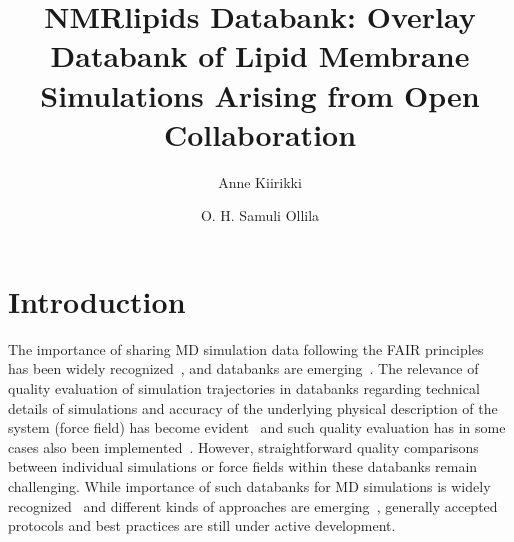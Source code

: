 \documentclass[fleqn,10pt]{wlscirep}
\title{NMRlipids Databank: Overlay Databank of Lipid Membrane Simulations Arising from Open Collaboration}
\author[1,*]{Anne Kiirikki}
\author[1,*]{O. H. Samuli Ollila}
\affil[1]{University of Helsinki, Institute of Biotechonology, Helsinki, Finland}
\affil[*]{samuli.ollila@helsinki.fi}
\begin{document}
\flushbottom
\maketitle
%
%
\thispagestyle{empty}


\section{Introduction}



The importance of sharing MD simulation data following the FAIR principles~\cite{wilkinson16} has been widely recognized~\cite{feig99,tai04,silva06,abraham19,hildebrand19,hospital20,abriata20,espigares20}, and databanks are emerging~\cite{meyer10,kamp10,hospital16,mixcoha16,newport19,bekker20,espigares20,leston22}.
The relevance of quality evaluation of simulation trajectories in databanks regarding technical details of simulations and accuracy of the underlying physical description of the system (force field) has become evident~\cite{tai04,meyer10,hospital20} and such quality evaluation has in some cases also been implemented~\cite{meyer10,hospital16}. However, straightforward quality comparisons between individual simulations or force fields within these databanks remain challenging. 
While importance of such databanks for MD simulations is widely recognized~\cite{feig99,tai04,silva06,abraham19,hildebrand19,hospital20,abriata20,espigares20} and different kinds of approaches are emerging~\cite{meyer10,kamp10,hospital16,mixcoha16,newport19,bekker20,espigares20,leston22}, generally accepted protocols and best practices are still under active development.
\end{document}
